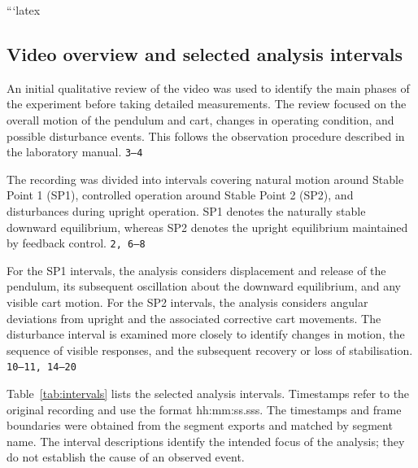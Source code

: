 \documentclass{article}
\newcommand{\manual}[1]{\texttt{#1}}
\begin{document}
```latex
\subsection{Video overview and selected analysis intervals}
\label{sec:video-overview}

An initial qualitative review of the video was used to identify
the main phases of the experiment before taking detailed
measurements. The review focused on the overall motion of the
pendulum and cart, changes in operating condition, and possible
disturbance events. This follows the observation procedure
described in the laboratory manual. \manual{3--4}

The recording was divided into intervals covering natural motion
around Stable Point 1 (SP1), controlled operation around Stable
Point 2 (SP2), and disturbances during upright operation.
SP1 denotes the naturally stable downward equilibrium, whereas
SP2 denotes the upright equilibrium maintained by feedback
control. \manual{2, 6--8}

For the SP1 intervals, the analysis considers displacement and
release of the pendulum, its subsequent oscillation about the
downward equilibrium, and any visible cart motion.
For the SP2 intervals, the analysis considers angular deviations
from upright and the associated corrective cart movements.
The disturbance interval is examined more closely to identify
changes in motion, the sequence of visible responses, and the
subsequent recovery or loss of stabilisation.
\manual{10--11, 14--20}

Table~\ref{tab:intervals} lists the selected analysis intervals.
Timestamps refer to the original recording and use the format
hh:mm:ss.sss. The timestamps and frame boundaries were obtained
from the segment exports and matched by segment name.
The interval descriptions identify the intended focus of the
analysis; they do not establish the cause of an observed event.
\end{document}
